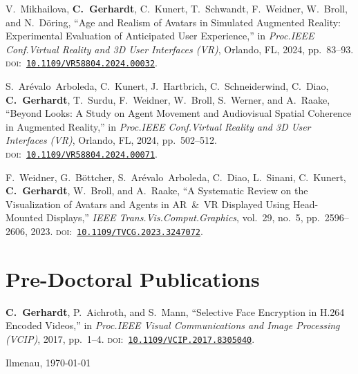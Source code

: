 \documentclass[11pt,a4paper]{article}
\newcommand{\doilink}[1]{\textsc{doi:}~\href{https://doi.org/#1}{\nolinkurl{#1}}}
\begin{document}
\begin{enumerate}[label={[\arabic*]}, leftmargin=2.5em, itemsep=6pt, resume]
\item V.~Mikhailova, \textbf{C.~Gerhardt}, C.~Kunert, T.~Schwandt, F.~Weidner, W.~Broll, and N.~D\"oring,
``Age and Realism of Avatars in Simulated Augmented Reality: Experimental Evaluation of Anticipated User Experience,''
in \emph{Proc.\@ IEEE Conf.\@ Virtual Reality and 3D User Interfaces (VR)},
Orlando, FL, 2024, pp.~83--93.
\doilink{10.1109/VR58804.2024.00032}.

\item S.~Ar\'evalo~Arboleda, C.~Kunert, J.~Hartbrich, C.~Schneiderwind, C.~Diao, \textbf{C.~Gerhardt}, T.~Surdu, F.~Weidner, W.~Broll, S.~Werner, and A.~Raake,
``Beyond Looks: A Study on Agent Movement and Audiovisual Spatial Coherence in Augmented Reality,''
in \emph{Proc.\@ IEEE Conf.\@ Virtual Reality and 3D User Interfaces (VR)},
Orlando, FL, 2024, pp.~502--512.
\doilink{10.1109/VR58804.2024.00071}.

\item F.~Weidner, G.~B\"ottcher, S.~Ar\'evalo~Arboleda, C.~Diao, L.~Sinani, C.~Kunert, \textbf{C.~Gerhardt}, W.~Broll, and A.~Raake,
``A Systematic Review on the Visualization of Avatars and Agents in AR~\&~VR Displayed Using Head-Mounted Displays,''
\emph{IEEE Trans.\@ Vis.\@ Comput.\@ Graphics}, vol.~29, no.~5, pp.~2596--2606, 2023.
\doilink{10.1109/TVCG.2023.3247072}.

\end{enumerate}

\section*{Pre-Doctoral Publications}

\begin{enumerate}[label={[\arabic*]}, leftmargin=2.5em, itemsep=6pt, resume]

\item \textbf{C.~Gerhardt}, P.~Aichroth, and S.~Mann,
``Selective Face Encryption in H.264 Encoded Videos,''
in \emph{Proc.\@ IEEE Visual Communications and Image Processing (VCIP)},
2017, pp.~1--4.
\doilink{10.1109/VCIP.2017.8305040}.

\end{enumerate}

\vfill
\begin{flushright}
  \small Ilmenau, \today
\end{flushright}
\end{document}
